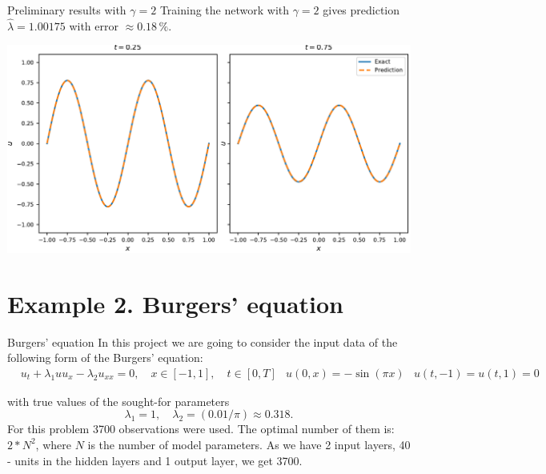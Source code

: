 \documentclass{beamer}
\def\\{}%
\begin{document}
\begin{frame}{Preliminary results with $\gamma=2$}
Training the network with $\gamma=2$ gives prediction $\widehat{\lambda} =
1.00175$ with error $\approx 0.18 \,\%$.

\vspace{0.5cm}
\centering
\includegraphics[scale=0.55]{images/heateq-predictions}

\end{frame}




\section{Example 2. Burgers' equation}

\begin{frame}{Burgers' equation}
In this project we are going to consider the input data of the following form of
the Burgers' equation:
\begin{align*}
&u_t + \lambda_1 u u_x - \lambda_2 u_{xx} = 0, \quad x\in[-1, 1], \quad t\in[0, T]\\
&u(0, x) = -\sin(\pi x) \\
&u(t, -1) = u(t, 1) = 0
\end{align*}

with true values of the sought-for parameters
\[
    \lambda_1 = 1,  \quad \lambda_2 = (0.01 / \pi) \approx 0.318.
\]
For this problem 3700 observations were used. The optimal number of them is: $2*N^2$, where $N$ is the number of model parameters. As we have 2 input layers, 40 - units in the hidden layers and 1 output layer, we get 3700.


\end{frame}
\end{document}
